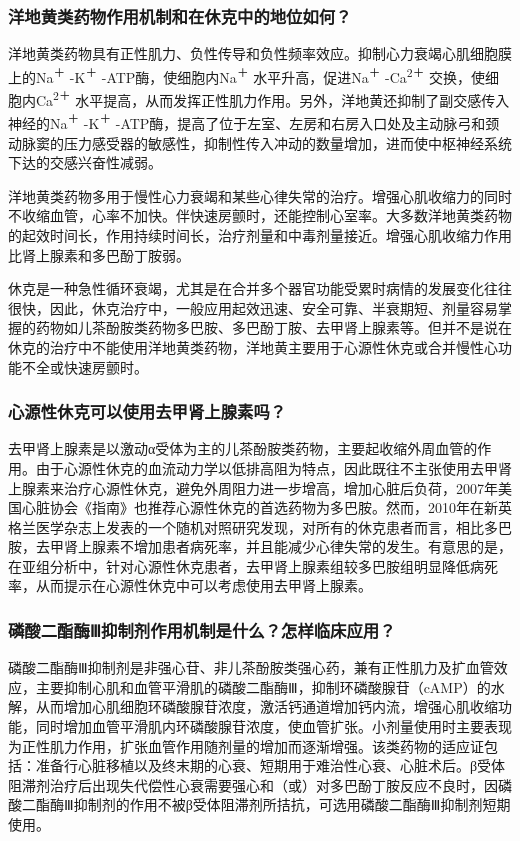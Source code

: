 \subsubsection{洋地黄类药物作用机制和在休克中的地位如何？}

洋地黄类药物具有正性肌力、负性传导和负性频率效应。抑制心力衰竭心肌细胞膜上的Na\textsuperscript{＋}
-K\textsuperscript{＋} -ATP酶，使细胞内Na\textsuperscript{＋}
水平升高，促进Na\textsuperscript{＋} -Ca\textsuperscript{2＋}
交换，使细胞内Ca\textsuperscript{2＋}
水平提高，从而发挥正性肌力作用。另外，洋地黄还抑制了副交感传入神经的Na\textsuperscript{＋}
-K\textsuperscript{＋}
-ATP酶，提高了位于左室、左房和右房入口处及主动脉弓和颈动脉窦的压力感受器的敏感性，抑制性传入冲动的数量增加，进而使中枢神经系统下达的交感兴奋性减弱。

洋地黄类药物多用于慢性心力衰竭和某些心律失常的治疗。增强心肌收缩力的同时不收缩血管，心率不加快。伴快速房颤时，还能控制心室率。大多数洋地黄类药物的起效时间长，作用持续时间长，治疗剂量和中毒剂量接近。增强心肌收缩力作用比肾上腺素和多巴酚丁胺弱。

休克是一种急性循环衰竭，尤其是在合并多个器官功能受累时病情的发展变化往往很快，因此，休克治疗中，一般应用起效迅速、安全可靠、半衰期短、剂量容易掌握的药物如儿茶酚胺类药物多巴胺、多巴酚丁胺、去甲肾上腺素等。但并不是说在休克的治疗中不能使用洋地黄类药物，洋地黄主要用于心源性休克或合并慢性心功能不全或快速房颤时。

\subsubsection{心源性休克可以使用去甲肾上腺素吗？}

去甲肾上腺素是以激动α受体为主的儿茶酚胺类药物，主要起收缩外周血管的作用。由于心源性休克的血流动力学以低排高阻为特点，因此既往不主张使用去甲肾上腺素来治疗心源性休克，避免外周阻力进一步增高，增加心脏后负荷，2007年美国心脏协会《指南》也推荐心源性休克的首选药物为多巴胺。然而，2010年在新英格兰医学杂志上发表的一个随机对照研究发现，对所有的休克患者而言，相比多巴胺，去甲肾上腺素不增加患者病死率，并且能减少心律失常的发生。有意思的是，在亚组分析中，针对心源性休克患者，去甲肾上腺素组较多巴胺组明显降低病死率，从而提示在心源性休克中可以考虑使用去甲肾上腺素。

\subsubsection{磷酸二酯酶Ⅲ抑制剂作用机制是什么？怎样临床应用？}

磷酸二酯酶Ⅲ抑制剂是非强心苷、非儿茶酚胺类强心药，兼有正性肌力及扩血管效应，主要抑制心肌和血管平滑肌的磷酸二酯酶Ⅲ，抑制环磷酸腺苷（cAMP）的水解，从而增加心肌细胞环磷酸腺苷浓度，激活钙通道增加钙内流，增强心肌收缩功能，同时增加血管平滑肌内环磷酸腺苷浓度，使血管扩张。小剂量使用时主要表现为正性肌力作用，扩张血管作用随剂量的增加而逐渐增强。该类药物的适应证包括：准备行心脏移植以及终末期的心衰、短期用于难治性心衰、心脏术后。β受体阻滞剂治疗后出现失代偿性心衰需要强心和（或）对多巴酚丁胺反应不良时，因磷酸二酯酶Ⅲ抑制剂的作用不被β受体阻滞剂所拮抗，可选用磷酸二酯酶Ⅲ抑制剂短期使用。

